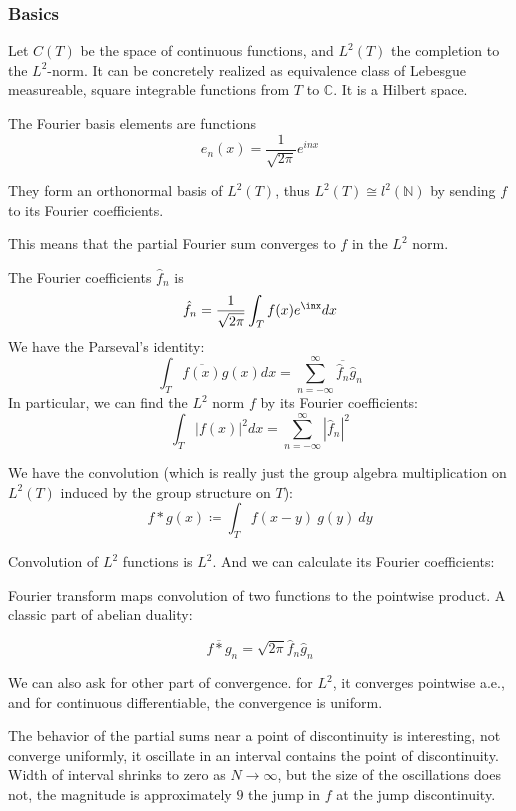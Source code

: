 \documentclass[main.tex]{subfiles}
\begin{document}
\subsubsection{Basics}
Let $C(T)$ be the space of continuous functions, and $L^2(T)$ the completion to the $L^2$-norm.
It can be concretely realized as equivalence class of Lebesgue measureable, square integrable functions from $T$ to $\mathbb{C}$. It is a Hilbert space. 

The Fourier basis elements are functions
$$
e_n(x) = \frac{1}{\sqrt{2 \pi}} e^{inx}
$$

\begin{theorem}
They form an orthonormal basis of $L^2(T)$, thus $L^2(T) \cong l^2(\mathbb{N})$ by sending $f$ to its Fourier coefficients.
\end{theorem}

This means that the partial Fourier sum converges to $f$ in the $L^2$ norm. 

The Fourier coefficients $\hat{f}_n$ is 
$$
\hat{f}_n = \frac{1}{\sqrt{2 \pi}} \int_T f(x) e^{\inx} dx
$$
We have the Parseval's identity:
$$
\int_T \overline{f(x)} g(x) dx = \sum_{n = -\infty} ^{\infty} \overline{\hat{f}_n} \hat{g}_n
$$
In particular, we can find the $L^2$ norm $f$ by its Fourier coefficients:
$$
\int_T |f(x)|^2 dx = \sum_{n = -\infty} ^{\infty} |\hat{f}_n|^2
$$

We have the convolution (which is really just the group algebra multiplication on $L^2(T)$ induced by the group structure on $T$):
$$
f * g(x) \coloneqq \int_T f(x-y)\ g(y)\  dy
$$

Convolution of $L^2$ functions is $L^2$. And we can calculate its Fourier coefficients:

Fourier transform maps convolution of two functions to the pointwise product. A classic part of abelian duality:
\begin{theorem}
$$
\overline{f * g}_n = \sqrt{2\pi} \hat{f}_n \hat{g}_n
$$
\end{theorem}

We can also ask for other part of convergence. for $L^2$, it converges pointwise a.e., and for continuous differentiable, the convergence is uniform.

The behavior of the partial sums near a point of discontinuity is interesting, not converge uniformly, it oscillate in an interval contains the point of discontinuity. Width of interval shrinks to zero as $N \rightarrow \infty$, but the size of the oscillations does not, the magnitude is approximately $9$ the jump in $f$ at the jump discontinuity.
\end{document}
